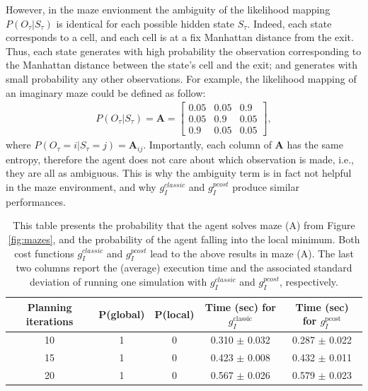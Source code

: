 \documentclass[twoside,11pt]{article}
\begin{document}
However, in the maze envionment the ambiguity of the likelihood mapping $P(O_\tau|S_\tau)$ is identical for each possible hidden state $S_\tau$. Indeed, each state corresponds to a cell, and each cell is at a fix Manhattan distance from the exit. Thus, each state generates with high probability the observation corresponding to the Manhattan distance between the state's cell and the exit; and generates with small probability any other observations. For example, the likelihood mapping of an imaginary maze could be defined as follow:
\begin{align*}
P(O_\tau|S_\tau) = \bm{A} = \begin{bmatrix}
0.05 & 0.05 & 0.9\\
0.05 & 0.9  & 0.05\\
0.9  & 0.05 & 0.05
\end{bmatrix},
\end{align*}
where $P(O_\tau = i|S_\tau = j) = \bm{A}_{ij}$. Importantly, each column of $\bm{A}$ has the same entropy, therefore the agent does not care about which observation is made, i.e., they are all as ambiguous. This is why the ambiguity term is in fact not helpful in the maze environment, and why $g^{classic}_I$ and $g^{pcost}_I$ produce similar performances.

\begin{table}[H]
\centering
\begin{tabular}{ |c|c|c|c|c| }
 \hline
 Planning iterations & P(global) & P(local) & Time (sec) for $g_I^\text{classic}$ & Time (sec) for $g_I^\text{pcost}$ \\
 \hline
 10 & 1 & 0 & 0.310 $\pm$ 0.032 & 0.287 $\pm$ 0.022 \\
 \hline
 15 & 1 & 0 & 0.423 $\pm$ 0.008 & 0.432 $\pm$ 0.011 \\
 \hline
 20 & 1 & 0 & 0.567 $\pm$ 0.026 & 0.579 $\pm$ 0.023 \\
 \hline
\end{tabular}
\caption{This table presents the probability that the agent solves maze (A) from Figure \ref{fig:mazes}, and the probability of the agent falling into the local minimum. Both cost functions $g^{classic}_I$ and $g^{pcost}_I$ lead to the above results in maze (A). The last two columns report the (average) execution time and the associated standard deviation of running one simulation with $g^{classic}_I$ and $g^{pcost}_I$, respectively.}
\label{tab:103}
\end{table}
\end{document}

